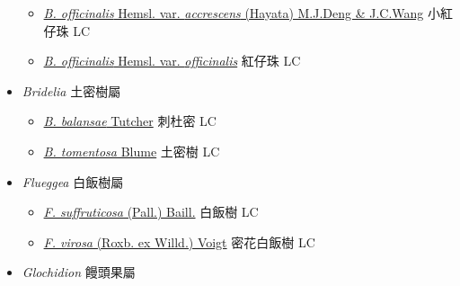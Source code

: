 \begin{itemize}
  \begin{itemize}
        \item[] \href{http://www.theplantlist.org/tpl1.1/search?q=Breynia+officinalis+var.+accrescens}{\textit{B. officinalis} Hemsl. var. \textit{accrescens} (Hayata) M.J.Deng \& J.C.Wang}   小紅仔珠 LC
        \item[] \href{http://www.theplantlist.org/tpl1.1/search?q=Breynia+officinalis+var.+officinalis}{\textit{B. officinalis} Hemsl. var. \textit{officinalis}}   紅仔珠 LC
  \end{itemize}
 \item[] \textit{Bridelia} 土密樹屬
                    
  \begin{itemize}
        \item[] \href{http://www.theplantlist.org/tpl1.1/search?q=Bridelia+balansae}{\textit{B. balansae} Tutcher}   刺杜密 LC
        \item[] \href{http://www.theplantlist.org/tpl1.1/search?q=Bridelia+tomentosa}{\textit{B. tomentosa} Blume}   土密樹 LC
  \end{itemize}
 \item[] \textit{Flueggea} 白飯樹屬
                    
  \begin{itemize}
        \item[] \href{http://www.theplantlist.org/tpl1.1/search?q=Flueggea+suffruticosa}{\textit{F. suffruticosa} (Pall.) Baill.}   白飯樹 LC
        \item[] \href{http://www.theplantlist.org/tpl1.1/search?q=Flueggea+virosa}{\textit{F. virosa} (Roxb. ex Willd.) Voigt}   密花白飯樹 LC
  \end{itemize}
 \item[] \textit{Glochidion} 饅頭果屬
                    

\end{itemize}
